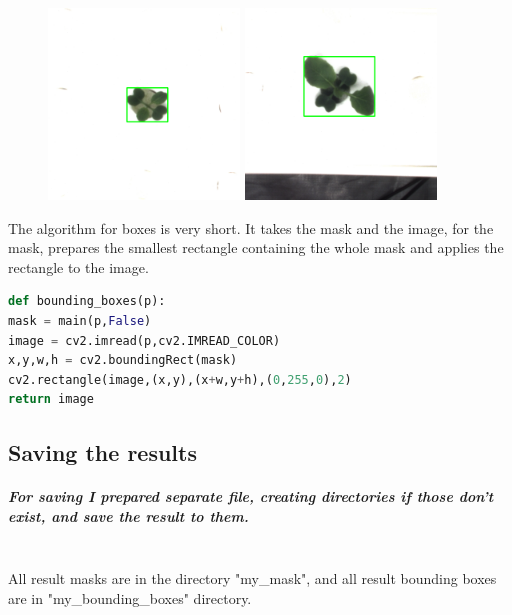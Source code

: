\documentclass[12pt]{article}
\begin{document}
\begin{center}
\begin{figure}[h!]
\centering
\includegraphics[width = 2in]{box_00_02_002_01.png}
\hspace{1cm}
\includegraphics[width = 2in]{box_00_03_005_00.png}
\end{figure}
\end{center}

The algorithm for boxes is very short. It takes the mask and the image, for the mask, prepares the smallest rectangle containing the  whole mask and applies the rectangle to the image.

\begin{lstlisting}[language=Python]
def bounding_boxes(p):
mask = main(p,False)
image = cv2.imread(p,cv2.IMREAD_COLOR)
x,y,w,h = cv2.boundingRect(mask)
cv2.rectangle(image,(x,y),(x+w,y+h),(0,255,0),2)
return image
\end{lstlisting}

\subsection{Saving the results}

\subparagraph{
For saving I prepared separate file, creating directories if those don't exist, and save the result to them. \\\\
}

All result masks are in the directory "my\_mask", and all result bounding boxes are in "my\_bounding\_boxes" directory.
\end{document}
